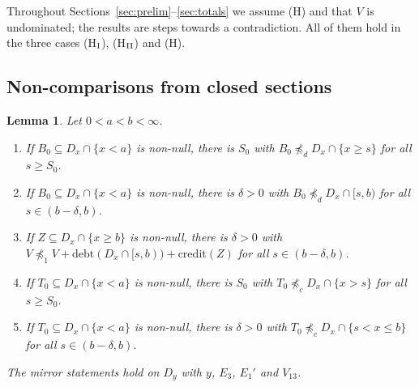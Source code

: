 \documentclass[11pt]{article}
\newtheorem{lemma}[theorem]{Lemma}
\theoremstyle{definition}\newtheorem{definition}[theorem]{Definition}
\theoremstyle{remark}\newtheorem{remark}[theorem]{Remark}
\newcommand{\debt}{\mathrm{debt}}
\newcommand{\cred}{\mathrm{credit}}
\begin{document}
Throughout Sections~\ref{sec:prelim}--\ref{sec:totals} we assume (H) and
that $V$ is undominated; the results are steps towards a contradiction. All
of them hold in the three cases (H$_{\rm I}$), (H$_{\rm II}$) and (H).

\subsection{Non-comparisons from closed sections}

\begin{lemma}\label{lem:noncomp}
Let $0<a<b<\infty$.
\begin{enumerate}[label=(\alph*)]
\item If $B_0\subseteq D_x\cap\{x<a\}$ is non-null, there is $S_0$ with
$B_0\not\preceq_dD_x\cap\{x\ge s\}$ for all $s\ge S_0$.
\item If $B_0\subseteq D_x\cap\{x<a\}$ is non-null, there is $\delta>0$ with
$B_0\not\preceq_dD_x\cap[s,b)$ for all $s\in(b-\delta,b)$.
\item If $Z\subseteq D_x\cap\{x\ge b\}$ is non-null, there is $\delta>0$ with
$V\not\preceq_1V+\debt(D_x\cap[s,b))+\cred(Z)$ for all $s\in(b-\delta,b)$.
\item If $T_0\subseteq D_x\cap\{x<a\}$ is non-null, there is $S_0$ with
$T_0\not\preceq_cD_x\cap\{x>s\}$ for all $s\ge S_0$.
\item If $T_0\subseteq D_x\cap\{x<a\}$ is non-null, there is $\delta>0$ with
$T_0\not\preceq_cD_x\cap\{s<x\le b\}$ for all $s\in(b-\delta,b)$.
\end{enumerate}
The mirror statements hold on $D_y$ with $y$, $E_3$, $E_1'$ and $V_{13}$.
\end{lemma}
\end{document}
